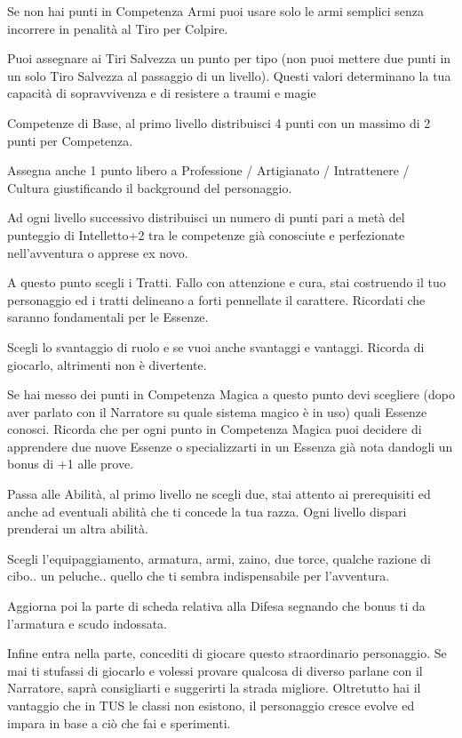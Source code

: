 \documentclass[a4paper,11pt,twoside,openany]{book}
\begin{document}
Se non hai punti in Competenza Armi puoi usare solo le armi semplici senza incorrere in penalità al Tiro per Colpire.

Puoi assegnare ai Tiri Salvezza un punto per tipo (non puoi mettere due punti in un solo Tiro Salvezza al passaggio di un livello). Questi valori determinano la tua capacità di sopravvivenza e di resistere a traumi e magie

Competenze di Base, al primo livello distribuisci 4 punti con un massimo di 2 punti per Competenza.

Assegna anche 1 punto libero a Professione / Artigianato / Intrattenere / Cultura giustificando il background del personaggio.

Ad ogni livello successivo distribuisci un numero di punti pari a metà del punteggio di Intelletto+2 tra le competenze già conosciute e perfezionate nell'avventura o apprese ex novo.

A questo punto scegli i Tratti. Fallo con attenzione e cura, stai costruendo il tuo personaggio ed i tratti delineano a forti pennellate il carattere. Ricordati che saranno fondamentali per le Essenze.

Scegli lo svantaggio di ruolo e se vuoi anche svantaggi e vantaggi. Ricorda di giocarlo, altrimenti non è divertente.

Se hai messo dei punti in Competenza Magica a questo punto devi scegliere (dopo aver parlato con il Narratore su quale sistema magico è in uso) quali Essenze conosci. Ricorda che per ogni punto in Competenza Magica puoi decidere di apprendere due nuove Essenze o specializzarti in un Essenza già nota dandogli un bonus di +1 alle prove.

Passa alle Abilità, al primo livello ne scegli due, stai attento ai prerequisiti ed anche ad eventuali abilità che ti concede la tua razza. Ogni livello dispari prenderai un altra abilità.

Scegli l'equipaggiamento, armatura, armi, zaino, due torce, qualche razione di cibo.. un peluche.. quello che ti sembra indispensabile per l'avventura.

Aggiorna poi la parte di scheda relativa alla Difesa segnando che bonus ti da l'armatura e scudo indossata.

Infine entra nella parte, concediti di giocare questo straordinario personaggio. Se mai ti stufassi di giocarlo e volessi provare qualcosa di diverso parlane con il Narratore, saprà consigliarti e suggerirti la strada migliore.
Oltretutto hai il vantaggio che in TUS le classi non esistono, il personaggio cresce evolve ed impara in base a ciò che fai e sperimenti.
\end{document}

